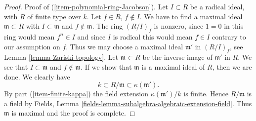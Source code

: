 \begin{proof}
\medskip\noindent
Proof of (\ref{item-polynomial-ring-Jacobson}). Let
$I \subset R$ be a radical ideal, with $R$ of finite type over $k$.
Let $f \in R$, $f \not \in I$. We have to find a maximal ideal
$\mathfrak m \subset R$ with $I \subset \mathfrak m$ and
$f \not \in \mathfrak m$. The ring $(R/I)_f$ is nonzero, since
$1 = 0$ in this ring would mean $f^n \in I$ and since $I$ is
radical this would mean $f \in I$ contrary to our assumption on $f$.
Thus we may choose a maximal ideal $\mathfrak m'$
in $(R/I)_f$, see Lemma \ref{lemma-Zariski-topology}.
Let $\mathfrak m \subset R$
be the inverse image of $\mathfrak m'$ in $R$. We see that
$I \subset \mathfrak m$
and $f \not \in \mathfrak m$. If we show that $\mathfrak m$ is a maximal
ideal of $R$, then we are done. We clearly have
$$
k \subset R/\mathfrak m \subset \kappa(\mathfrak m').
$$
By part (\ref{item-finite-kappa}) the field extension
$\kappa(\mathfrak m')/k$ is finite. Hence
$R/\mathfrak m$ is a field by Fields, Lemma
\ref{fields-lemma-subalgebra-algebraic-extension-field}.
Thus $\mathfrak m$ is maximal and the proof is complete.
\end{proof}